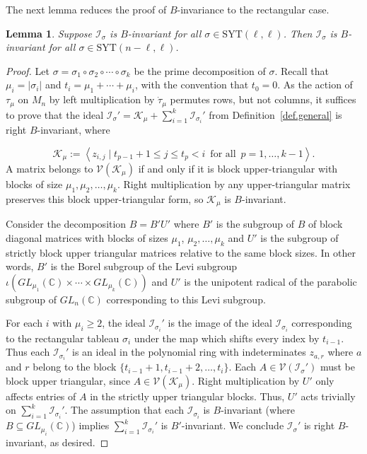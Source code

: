 \documentclass[11pt]{amsart}
\newtheorem{lemma}[theorem]{Lemma}
\theoremstyle{remark}
\theoremstyle{remark}
\theoremstyle{definition}
\theoremstyle{definition}
\theoremstyle{definition}
\numberwithin{equation}{section}
\newcommand{\C}{\mathbb{C}}           %
\newcommand{\gs}{\sigma}
\newcommand{\ci}{\mathcal{I}}
\newcommand{\cv}{\mathcal{V}}
\newcommand{\SYT}{\mathrm{SYT}}
\newcommand{\parsum}{t}
\begin{document}
The next lemma reduces the proof of $B$-invariance to the rectangular case.

\begin{lemma} Suppose $\ci_\gs$ is $B$-invariant for all $\gs\in \SYT(\ell, \ell)$. Then $\ci_\gs$ is $B$-invariant for all $\gs\in \SYT(n-\ell, \ell)$. 
\end{lemma}
\begin{proof} Let $\gs = \gs_1\circ\gs_2\circ \cdots \circ \gs_k$ be the prime decomposition of $\gs$. Recall that $\mu_i = |\gs_i|$ and $\parsum_{i} = \mu_1+\cdots +\mu_i$, with the convention that $\parsum_{0} = 0$.   As the action of $\tau_\mu$ on $M_n$ by left multiplication by $\dot \tau _\mu$ permutes rows, but not columns, it suffices to prove that the ideal $\ci_{\gs}' = \mathcal{K}_\mu+ \sum_{i=1}^k \ci_{\gs_i}'$ from Definition~\ref{def.general} is right $B$-invariant, where

\[
\mathcal{K}_\mu:= \left< z_{i,j}\mid \parsum_{p-1}+1\leq j \leq \parsum_p<i \, \text{ for all }\, p= 1, \ldots ,k-1 \right>.
\]
A matrix belongs to $\cv(\mathcal{K}_\mu)$ if and only if it is block upper-triangular with blocks of size $\mu_1, \mu_2, \ldots, \mu_k$. Right multiplication by any upper-triangular matrix preserves this block upper-triangular form, so $\mathcal{K}_\mu$ is $B$-invariant. 



Consider the decomposition $B = B'U'$ where $B'$ is the subgroup of $B$ of block diagonal matrices with blocks of sizes $\mu_1$, $\mu_2, \ldots, \mu_k$ and $U'$ is the subgroup of strictly block upper triangular matrices relative to the same block sizes. 
In other words, $B'$ is the Borel subgroup of the Levi subgroup $\iota(GL_{\mu_1}(\C)\times \cdots \times GL_{\mu_k}(\C))$ and $U'$ is the unipotent radical of the parabolic subgroup of $GL_n(\C)$ corresponding to this Levi subgroup.



For each $i$ with $\mu_i\geq 2$, the ideal $\ci_{\gs_i}'$ is the image of the ideal $\ci_{\gs_i}$ corresponding to the rectangular tableau $\gs_i$ under the map which shifts every index by $\parsum_{i-1}$. Thus each $\ci_{\gs_i}'$ is an ideal in the polynomial ring with indeterminates $z_{a,r}$ where $a$ and $r$ belong to the block $\{\parsum_{i-1}+1,\parsum_{i-1}+2, \ldots, \parsum_{i} \}$. 
Each  $A\in \cv(\ci_\gs')$ must be block upper triangular, since $A\in \cv(\mathcal{K}_\mu)$. Right multiplication by $U'$ only affects entries of $A$ in the strictly upper triangular blocks.  Thus, $U'$ acts trivially on $\sum_{i=1}^k \ci_{\gs_i}'$.  The assumption that each $\ci_{\gs_i}$ is $B$-invariant (where $B \subseteq GL_{\mu_i}(\C)$) implies $\sum_{i=1}^k \ci_{\gs_i}'$ is $B'$-invariant. We conclude $\ci_\gs'$ is right $B$-invariant, as desired.
\end{proof}
\end{document}
